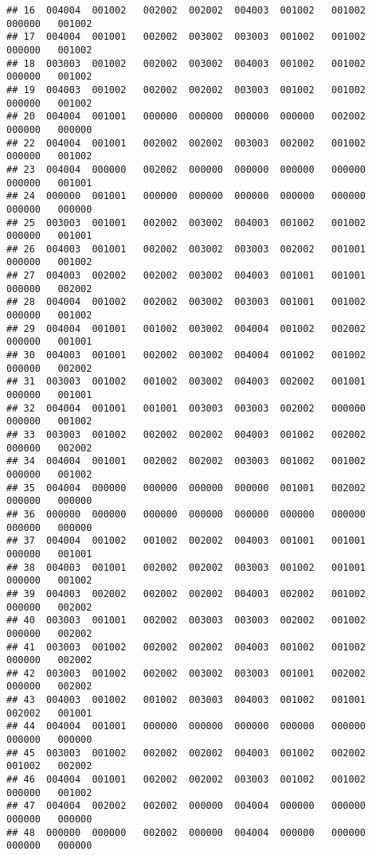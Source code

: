 \documentclass[
]{article}
\begin{document}
\begin{verbatim}
## 16  004004  001002   002002  002002  004003  001002   001002   000000   001002
## 17  004004  001001   002002  003002  003003  001002   001002   000000   001002
## 18  003003  001002   002002  003002  004003  001002   001002   000000   001002
## 19  004003  001002   002002  002002  003003  001002   001002   000000   001002
## 20  004004  001001   000000  000000  000000  000000   002002   000000   000000
## 22  004004  001001   002002  002002  003003  002002   001002   000000   001002
## 23  004004  000000   002002  000000  000000  000000   000000   000000   001001
## 24  000000  001001   000000  000000  000000  000000   000000   000000   000000
## 25  003003  001001   002002  003002  004003  001002   001002   000000   001001
## 26  004003  001001   002002  003002  003003  002002   001001   000000   001002
## 27  004003  002002   002002  003002  004003  001001   001001   000000   002002
## 28  004004  001002   002002  003002  003003  001001   001002   000000   001002
## 29  004004  001001   001002  003002  004004  001002   002002   000000   001001
## 30  004003  001001   002002  003002  004004  001002   001002   000000   002002
## 31  003003  001002   001002  003002  004003  002002   001001   000000   001001
## 32  004004  001001   001001  003003  003003  002002   000000   000000   001002
## 33  003003  001002   002002  002002  004003  001002   002002   000000   002002
## 34  004004  001001   002002  002002  003003  001002   001002   000000   001002
## 35  004004  000000   000000  000000  000000  001001   002002   000000   000000
## 36  000000  000000   000000  000000  000000  000000   000000   000000   000000
## 37  004004  001002   001002  002002  004003  001001   001001   000000   001001
## 38  004003  001001   002002  002002  003003  001002   001001   000000   001002
## 39  004003  002002   002002  002002  004003  002002   001002   000000   002002
## 40  003003  001001   002002  003003  003003  002002   001002   000000   002002
## 41  003003  001002   002002  002002  004003  001002   001002   000000   002002
## 42  003003  001002   002002  003002  003003  001001   002002   000000   002002
## 43  004003  001002   001002  003003  004003  001002   001001   002002   001001
## 44  004004  001001   000000  000000  000000  000000   000000   000000   000000
## 45  003003  001002   002002  002002  004003  001002   002002   001002   002002
## 46  004004  001001   002002  002002  003003  001002   001002   000000   001002
## 47  004004  002002   002002  000000  004004  000000   000000   000000   000000
## 48  000000  000000   002002  000000  004004  000000   000000   000000   000000

\end{verbatim}
\end{document}
